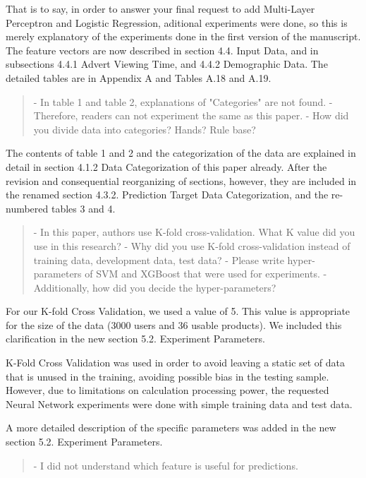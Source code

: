 \documentclass[review]{elsarticle}
\begin{document}
That is to say, in order to answer your final request to add Multi-Layer Perceptron and Logistic Regression, aditional experiments were done, so this is merely explanatory of the experiments done in the first version of the manuscript. The feature vectors are now described in section 4.4. Input Data, and in subsections 4.4.1 Advert Viewing Time, and 4.4.2 Demographic Data. The detailed tables are in Appendix A and Tables A.18 and A.19.

\begin{quotation}
- In table 1 and table 2, explanations of "Categories" are not found.
  - Therefore, readers can not experiment the same as this paper.
- How did you divide data into categories? Hands? Rule base?
\end{quotation}

The contents of table 1 and 2 and the categorization of the data are explained in detail in section 4.1.2 Data Categorization of this paper already. After the revision and consequential reorganizing of sections, however, they are included in the renamed section 4.3.2. Prediction Target Data Categorization, and the re-numbered tables 3 and 4.

\begin{quotation}
- In this paper, authors use K-fold cross-validation. What K value did you use in this research?
- Why did you use K-fold cross-validation instead of training data, development data, test data?
- Please write hyper-parameters of SVM and XGBoost that were used for experiments.
  - Additionally, how did you decide the hyper-parameters?
\end{quotation}

For our K-fold Cross Validation, we used a value of 5. This value is appropriate for the size of the data (3000 users and 36 usable products). We included this clarification in the new section 5.2. Experiment Parameters. 

K-Fold Cross Validation was used in order to avoid leaving a static set of data that is unused in the training, avoiding possible bias in the testing sample. However, due to limitations on calculation processing power, the requested Neural Network experiments were done with simple training data and test data.

A more detailed description of the specific parameters was added in the new section 5.2. Experiment Parameters.

\begin{quotation}
- I did not understand which feature is useful for predictions.
\end{quotation}
\end{document}
